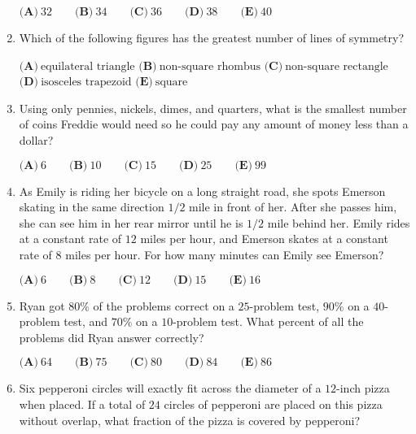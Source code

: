 \documentclass{article}
\begin{document}
\begin{enumerate}[label=\arabic*., itemsep=0.5em]
\( \textbf{(A)}\ 32 \qquad\textbf{(B)}\ 34\qquad\textbf{(C)}\ 36\qquad\textbf{(D)}\ 38\qquad\textbf{(E)}\ 40 \)\par \vspace{0.5em}\item Which of the following figures has the greatest number of lines of symmetry? 

\( \textbf{(A)}\ \text{equilateral triangle}\)
\(\textbf{(B)}\ \text{non-square rhombus} \)
\(\textbf{(C)}\ \text{non-square rectangle}\)
\(\textbf{(D)}\ \text{isosceles trapezoid}\)
\(\textbf{(E)}\ \text{square} \)\par \vspace{0.5em}\item Using only pennies, nickels, dimes, and quarters, what is the smallest number of coins Freddie would need so he could pay any amount of money less than a dollar? 

\( \textbf{(A)}\ 6 \qquad\textbf{(B)}\ 10\qquad\textbf{(C)}\ 15\qquad\textbf{(D)}\ 25\qquad\textbf{(E)}\ 99 \)\par \vspace{0.5em}\item As Emily is riding her bicycle on a long straight road, she spots Emerson skating in the same direction \(1/2\) mile in front of her. After she passes him, she can see him in her rear mirror until he is \(1/2\) mile behind her. Emily rides at a constant rate of \(12\) miles per hour, and Emerson skates at a constant rate of \(8\) miles per hour. For how many minutes can Emily see Emerson? 

\( \textbf{(A)}\ 6 \qquad\textbf{(B)}\ 8\qquad\textbf{(C)}\ 12\qquad\textbf{(D)}\ 15\qquad\textbf{(E)}\ 16 \)\par \vspace{0.5em}\item Ryan got \(80\%\) of the problems correct on a \(25\)-problem test, \(90\%\) on a \(40\)-problem test, and \(70\%\) on a \(10\)-problem test. What percent of all the problems did Ryan answer correctly? 

\( \textbf{(A)}\ 64 \qquad\textbf{(B)}\ 75\qquad\textbf{(C)}\ 80\qquad\textbf{(D)}\ 84\qquad\textbf{(E)}\ 86 \)\par \vspace{0.5em}\item Six pepperoni circles will exactly fit across the diameter of a \(12\)-inch pizza when placed. If a total of \(24\) circles of pepperoni are placed on this pizza without overlap, what fraction of the pizza is covered by pepperoni?


\end{enumerate}
\end{document}
